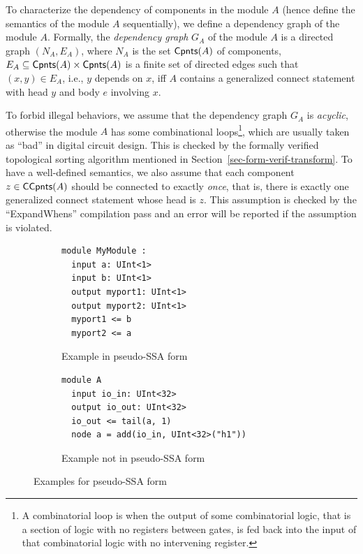 To characterize the dependency of components in the module $A$ (hence define the semantics of the module $A$ sequentially), we define a dependency graph of the module $A$.
Formally, the \emph{dependency graph} $G_A$ of the module $A$ is a directed graph $(N_A, E_A)$, where $N_A$ is the set ${\sf Cpnts}(A)$ of components,
$E_A\subseteq {\sf Cpnts}(A)\times {\sf Cpnts}(A)$ is a finite set of directed edges such that
$(x, y)\in E_A$, i.e., $y$ depends on $x$, iff $A$ contains a generalized connect statement with head $y$ and body $e$ involving $x$.
%

To forbid illegal behaviors, we assume that the dependency graph $G_A$ is \emph{acyclic},
otherwise the module $A$ has some combinational loops\footnote{A combinatorial loop is when the output of some combinatorial logic, that is a section of logic with no registers between gates, is fed back into the input of that combinatorial logic with no intervening register.}, which are usually taken as ``bad'' in digital circuit design.
This is checked by the formally verified topological sorting algorithm mentioned in Section~\ref{sec-form-verif-transform}.
To have a well-defined semantics, we also assume that each component $z \in {\sf CCpnts}(A)$ should be connected to exactly \emph{once}, that is,
there is exactly one generalized connect statement whose head is $z$. This assumption
is checked by the ``ExpandWhens'' compilation pass and an error will be reported if the assumption
is violated. 


\begin{figure}[!t]
\centering
\begin{subfigure}[b]{0.4\textwidth}
         \centering
\begin{lstlisting}
module MyModule :
  input a: UInt<1>
  input b: UInt<1>
  output myport1: UInt<1>
  output myport2: UInt<1>
  myport1 <= b
  myport2 <= a
\end{lstlisting}
\caption{Example in pseudo-SSA form}
\label{fig:exampleinSSA}
\end{subfigure}
\hspace{4mm}
\begin{subfigure}[b]{0.45\textwidth}
         \centering
\begin{lstlisting}
module A
  input io_in: UInt<32>
  output io_out: UInt<32>
  io_out <= tail(a, 1)
  node a = add(io_in, UInt<32>("h1"))
\end{lstlisting}
\caption{Example not in pseudo-SSA form}
\label{fig:examplenotinSSA}
\end{subfigure}
\caption{Examples for pseudo-SSA form}
\end{figure}



